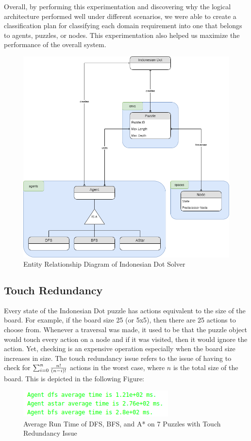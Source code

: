 Overall, by performing this experimentation and discovering why the logical architecture performed well under different scenarios, we were able to create a classification plan for classifying each domain requirement into one that belongs to agents, puzzles, or nodes. This experimentation also helped us maximize the performance of the overall system.

\begin{figure}[H]
\includegraphics[width=0.75\linewidth]{assets/schema.png}
\caption{Entity Relationship Diagram of Indonesian Dot Solver} \label{fig2}
\end{figure}

\subsection{Touch Redundancy}

Every state of the Indonesian Dot puzzle has actions equivalent to the size of the board. For example, if the board size 25 (or 5x5), then there are 25 actions to choose from. Whenever a traversal was made, it used to be that the puzzle object would touch every action on a node and if it was visited, then it would ignore the action. Yet, checking is an expensive operation especially when the board size increases in size. The touch redundancy issue refers to the issue of having to check for $\sum_{i=0}^{n} {{n!}\over{(n-i)!}} $ actions in the worst case, where $n$ is the total size of the board. This is depicted in the following Figure: 

\begin{figure}[H]
\includegraphics[width=0.75\linewidth]{assets/touch_redundancy.png}
\caption{Average Run Time of DFS, BFS, and A* on 7 Puzzles with Touch Redundancy Issue} \label{fig3}
\end{figure}

